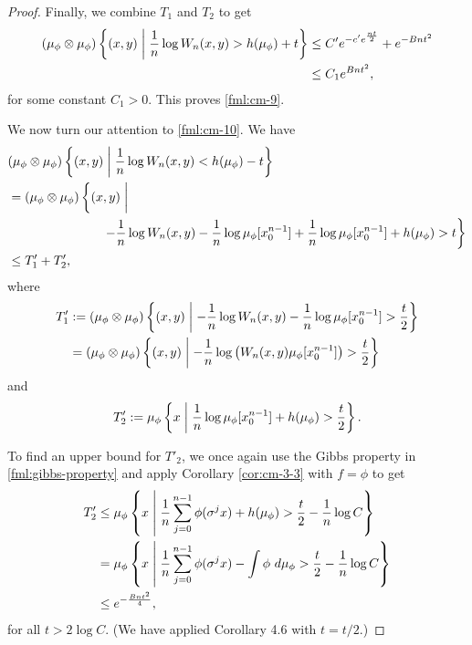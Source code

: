 \begin{theorem}
\begin{proof}
		Finally, we combine $T_1$ and $T_2$ to get
		\begin{align*}
			(\mu_\phi \otimes \mu_\phi)\left\{(x, y) \mathrel{}\middle|\mathrel{} \frac{1}{n}\log{W_n(x, y)} > h(\mu_\phi) + t\right\} &\leq C'e^{-c'e^\frac{nt}{2}} + e^{-Bnt^2} \\
				& \leq C_1 e^{Bnt^2},
		\end{align*}
		for some constant $C_1 > 0$. This proves \eqref{fml:cm-9}.
		
		We now turn our attention to \eqref{fml:cm-10}. We have
		\begin{align*}
			&(\mu_\phi \otimes \mu_\phi)\left\{(x, y) \midmid \frac{1}{n}\log{W_n(x, y)} < h(\mu_\phi) - t\right\} \\
				&= (\mu_\phi \otimes \mu_\phi)\left\{(x, y) \midmid \vphantom{\frac{1}{n}} \right. \\
				&\hspace{26mm} \left. -\frac{1}{n}\log{W_n(x, y)} - \frac{1}{n}\log{\mu_\phi[x_0^{n - 1}]} + \frac{1}{n}\log{\mu_\phi[x_0^{n - 1}]} + h(\mu_\phi) > t\right\} \\
				&\leq T'_1 + T'_2,
		\end{align*}
		where
		\begin{align*}
			T'_1 &:= (\mu_\phi \otimes \mu_\phi)\left\{(x, y) \mathrel{}\middle|\mathrel{} -\frac{1}{n}\log{W_n(x, y)} - \frac{1}{n}\log{\mu_\phi[x_0^{n - 1}]} > \frac{t}{2}\right\} \\
				&= (\mu_\phi \otimes \mu_\phi)\left\{(x, y) \mathrel{}\middle|\mathrel{} -\frac{1}{n}\log\left(W_n(x, y) \mu_\phi[x_0^{n - 1}]\right) > \frac{t}{2}\right\}
		\end{align*}
		and
		\[
			T'_2 := \mu_\phi \left\{x \mathrel{}\middle|\mathrel{} \frac{1}{n}\log{\mu_\phi[x_0^{n - 1}]} + h(\mu_\phi) > \frac{t}{2}\right\}.
		\]
		
		To find an upper bound for $T'_2$, we once again use the Gibbs property in \eqref{fml:gibbs-property} and apply Corollary \ref{cor:cm-3-3} with $f = \phi$ to get
		\begin{align*}
			T'_2 &\leq \mu_\phi\left\{x \mathrel{}\middle|\mathrel{} \frac{1}{n}\sum_{j = 0}^{n - 1}{\phi(\sigma^j{x})} + h(\mu_\phi) > \frac{t}{2} - \frac{1}{n}\log{C}\right\} \\
				&= \mu_\phi\left\{x \mathrel{}\middle|\mathrel{} \frac{1}{n}\sum_{j = 0}^{n - 1}{\phi(\sigma^j{x})} - \int{\phi\ d\mu_\phi} > \frac{t}{2} - \frac{1}{n}\log{C}\right\} \\
				&\leq e^{-\frac{Bnt^2}{4}},
		\end{align*}
		for all $t > 2\log{C}$. (We have applied Corollary 4.6 with $t = t / 2$.)
		

\end{proof}
\end{theorem}
